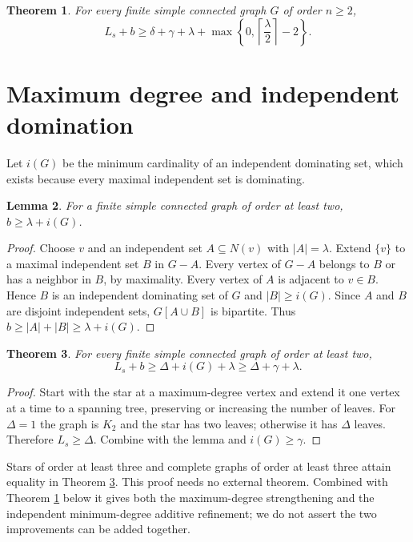 \documentclass[11pt,a4paper]{article}
\newtheorem{theorem}{Theorem}
\newtheorem{lemma}[theorem]{Lemma}
\newcommand{\ls}{L_s}
\newcommand{\lam}{\lambda}
\begin{document}
\begin{theorem}\label{main}
For every finite simple connected graph $G$ of order $n\ge2$,
\[
\ls+b\ge\delta+\gamma+\lam+
\max\left\{0,\left\lceil\frac{\lam}{2}\right\rceil-2\right\}.
\]
\end{theorem}

\section{Maximum degree and independent domination}
Let $i(G)$ be the minimum cardinality of an independent dominating set, which exists because every maximal independent set is dominating.
\begin{lemma}
For a finite simple connected graph of order at least two, $b\ge \lambda+i(G)$.
\end{lemma}
\begin{proof}
Choose $v$ and an independent set $A\subseteq N(v)$ with $|A|=\lambda$. Extend $\{v\}$ to a maximal independent set $B$ in $G-A$. Every vertex of $G-A$ belongs to $B$ or has a neighbor in $B$, by maximality. Every vertex of $A$ is adjacent to $v\in B$. Hence $B$ is an independent dominating set of $G$ and $|B|\ge i(G)$. Since $A$ and $B$ are disjoint independent sets, $G[A\cup B]$ is bipartite. Thus $b\ge|A|+|B|\ge\lambda+i(G)$.
\end{proof}
\begin{theorem}\label{maxdegree}
For every finite simple connected graph of order at least two,
\[
 L_s+b\ge\Delta+i(G)+\lambda\ge\Delta+\gamma+\lambda.
\]
\end{theorem}
\begin{proof}
Start with the star at a maximum-degree vertex and extend it one vertex at a time to a spanning tree, preserving or increasing the number of leaves. For $\Delta=1$ the graph is $K_2$ and the star has two leaves; otherwise it has $\Delta$ leaves. Therefore $L_s\ge\Delta$. Combine with the lemma and $i(G)\ge\gamma$.
\end{proof}
Stars of order at least three and complete graphs of order at least three attain equality in Theorem \ref{maxdegree}. This proof needs no external theorem. Combined with Theorem \ref{main} below it gives both the maximum-degree strengthening and the independent minimum-degree additive refinement; we do not assert the two improvements can be added together.
\end{document}
